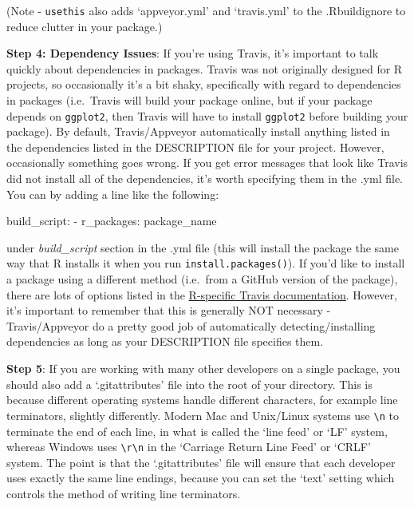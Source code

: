 \documentclass[
]{book}
\newenvironment{Shaded}{\begin{snugshade}}{\end{snugshade}}
\newcommand{\NormalTok}[1]{#1}
\newcommand{\SpecialCharTok}[1]{\textcolor[rgb]{0.00,0.00,0.00}{#1}}
\begin{document}
(Note - \texttt{usethis} also adds `appveyor.yml' and `travis.yml' to the .Rbuildignore to reduce clutter in your package.)

\textbf{Step 4: Dependency Issues}: If you're using Travis, it's important to talk quickly about dependencies in packages. Travis was not originally designed for R projects, so occasionally it's a bit shaky, specifically with regard to dependencies in packages (i.e.~Travis will build your package online, but if your package depends on \texttt{ggplot2}, then Travis will have to install \texttt{ggplot2} before building your package). By default, Travis/Appveyor automatically install anything listed in the dependencies listed in the DESCRIPTION file for your project. However, occasionally something goes wrong. If you get error messages that look like Travis did not install all of the dependencies, it's worth specifying them in the .yml file. You can by adding a line like the following:

\begin{Shaded}
\begin{Highlighting}[]
\NormalTok{build\_script}\SpecialCharTok{:}
  \SpecialCharTok{{-}}\NormalTok{ r\_packages}\SpecialCharTok{:}\NormalTok{ package\_name}
\end{Highlighting}
\end{Shaded}

under \emph{build\_script} section in the .yml file (this will install the package the same way that R installs it when you run \texttt{install.packages()}). If you'd like to install a package using a different method (i.e.~from a GitHub version of the package), there are lots of options listed in the \href{https://docs.travis-ci.com/user/languages/r/}{R-specific Travis documentation}. However, it's important to remember that this is generally NOT necessary - Travis/Appveyor do a pretty good job of automatically detecting/installing dependencies as long as your DESCRIPTION file specifies them.

\textbf{Step 5}: If you are working with many other developers on a single package, you should also add a `.gitattributes' file into the root of your directory. This is because different operating systems handle different characters, for example line terminators, slightly differently. Modern Mac and Unix/Linux systems use \texttt{\textbackslash{}n} to terminate the end of each line, in what is called the `line feed' or `LF' system, whereas Windows uses \texttt{\textbackslash{}r\textbackslash{}n} in the `Carriage Return Line Feed' or `CRLF' system. The point is that the `.gitattributes' file will ensure that each developer uses exactly the same line endings, because you can set the `text' setting which controls the method of writing line terminators.
\end{document}
